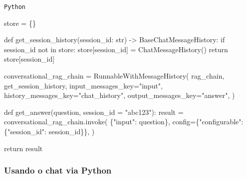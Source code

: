 \documentclass[
  letterpaper,
  DIV=11,
  numbers=noendperiod]{scrartcl}
\newenvironment{Shaded}{\begin{snugshade}}{\end{snugshade}}
\newcommand{\BuiltInTok}[1]{\textcolor[rgb]{0.00,0.23,0.31}{#1}}
\newcommand{\ControlFlowTok}[1]{\textcolor[rgb]{0.00,0.23,0.31}{#1}}
\newcommand{\KeywordTok}[1]{\textcolor[rgb]{0.00,0.23,0.31}{#1}}
\newcommand{\NormalTok}[1]{\textcolor[rgb]{0.00,0.23,0.31}{#1}}
\newcommand{\OperatorTok}[1]{\textcolor[rgb]{0.37,0.37,0.37}{#1}}
\newcommand{\StringTok}[1]{\textcolor[rgb]{0.13,0.47,0.30}{#1}}
\begin{document}
\begin{codelisting}

\caption{\texttt{Python}}

\begin{Shaded}
\begin{Highlighting}[]
\NormalTok{store }\OperatorTok{=}\NormalTok{ \{\}}

\KeywordTok{def}\NormalTok{ get\_session\_history(session\_id: }\BuiltInTok{str}\NormalTok{) }\OperatorTok{{-}\textgreater{}}\NormalTok{ BaseChatMessageHistory:}
    \ControlFlowTok{if}\NormalTok{ session\_id }\KeywordTok{not} \KeywordTok{in}\NormalTok{ store:}
\NormalTok{        store[session\_id] }\OperatorTok{=}\NormalTok{ ChatMessageHistory()}
    \ControlFlowTok{return}\NormalTok{ store[session\_id]}

\NormalTok{conversational\_rag\_chain }\OperatorTok{=}\NormalTok{ RunnableWithMessageHistory(}
\NormalTok{    rag\_chain,}
\NormalTok{    get\_session\_history,}
\NormalTok{    input\_messages\_key}\OperatorTok{=}\StringTok{"input"}\NormalTok{,}
\NormalTok{    history\_messages\_key}\OperatorTok{=}\StringTok{"chat\_history"}\NormalTok{,}
\NormalTok{    output\_messages\_key}\OperatorTok{=}\StringTok{"answer"}\NormalTok{,}
\NormalTok{)}

\KeywordTok{def}\NormalTok{ get\_answer(question, session\_id }\OperatorTok{=} \StringTok{"abc123"}\NormalTok{):}
\NormalTok{  result }\OperatorTok{=}\NormalTok{ conversational\_rag\_chain.invoke(}
\NormalTok{    \{}\StringTok{"input"}\NormalTok{: question\},}
\NormalTok{    config}\OperatorTok{=}\NormalTok{\{}\StringTok{"configurable"}\NormalTok{: \{}\StringTok{"session\_id"}\NormalTok{: session\_id\}\},}
\NormalTok{  )}
  
  \ControlFlowTok{return}\NormalTok{ result}
\end{Highlighting}
\end{Shaded}

\end{codelisting}

\hypertarget{usando-o-chat-via-python}{%
\subsubsection{Usando o chat via
Python}\label{usando-o-chat-via-python}}
\end{document}

